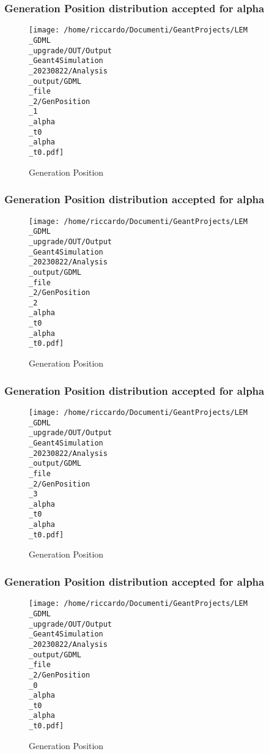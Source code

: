 \documentclass[8pt]{beamer}
\begin{document}
            \begin{frame}
                \frametitle{Generation Position distribution accepted for alpha}
            
        \begin{figure}[h]
            \centering
            \texttt{[image: /home/riccardo/Documenti/GeantProjects/LEM\\\_GDML\\\_upgrade/OUT/Output\\\_Geant4Simulation\\\_20230822/Analysis\\\_output/GDML\\\_file\\\_2/GenPosition\\\_1\\\_alpha\\\_t0\\\_alpha\\\_t0.pdf]}
            \caption{Generation Position}
        \end{figure}
        
            \end{frame}
            
            \begin{frame}
                \frametitle{Generation Position distribution accepted for alpha}
            
        \begin{figure}[h]
            \centering
            \texttt{[image: /home/riccardo/Documenti/GeantProjects/LEM\\\_GDML\\\_upgrade/OUT/Output\\\_Geant4Simulation\\\_20230822/Analysis\\\_output/GDML\\\_file\\\_2/GenPosition\\\_2\\\_alpha\\\_t0\\\_alpha\\\_t0.pdf]}
            \caption{Generation Position}
        \end{figure}
        
            \end{frame}
            
            \begin{frame}
                \frametitle{Generation Position distribution accepted for alpha}
            
        \begin{figure}[h]
            \centering
            \texttt{[image: /home/riccardo/Documenti/GeantProjects/LEM\\\_GDML\\\_upgrade/OUT/Output\\\_Geant4Simulation\\\_20230822/Analysis\\\_output/GDML\\\_file\\\_2/GenPosition\\\_3\\\_alpha\\\_t0\\\_alpha\\\_t0.pdf]}
            \caption{Generation Position}
        \end{figure}
        
            \end{frame}
            
            \begin{frame}
                \frametitle{Generation Position distribution accepted for alpha}
            
        \begin{figure}[h]
            \centering
            \texttt{[image: /home/riccardo/Documenti/GeantProjects/LEM\\\_GDML\\\_upgrade/OUT/Output\\\_Geant4Simulation\\\_20230822/Analysis\\\_output/GDML\\\_file\\\_2/GenPosition\\\_0\\\_alpha\\\_t0\\\_alpha\\\_t0.pdf]}
            \caption{Generation Position}
        \end{figure}
        
            \end{frame}
            
\end{document}
